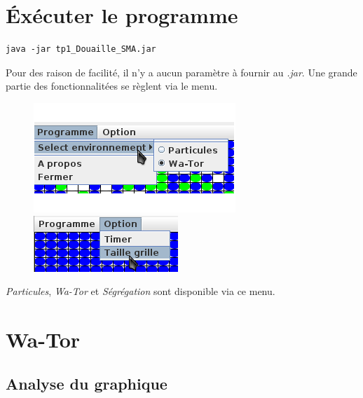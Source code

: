 \documentclass[a4paper,12pt]{report}
\begin{document}


\setcounter{page}{1} 
\newpage

\section*{Éxécuter le programme}

\begin{lstlisting}[style=Java]
java -jar tp1_Douaille_SMA.jar
\end{lstlisting}

Pour des raison de facilité, il n'y a aucun paramètre à fournir au \textit{.jar}. Une grande partie des fonctionnalitées se règlent via le menu.

\begin{figure}[!ht]
	\center
	\includegraphics[scale=0.4]{./image/menu2.png}
	\includegraphics[scale=0.4]{./image/menu1.png}
\end{figure}

\textit{Particules}, \textit{Wa-Tor} et \textit{Ségrégation} sont disponible via ce menu.

\newpage

\section*{Wa-Tor}
\subsection*{Analyse du graphique}
\end{document}
